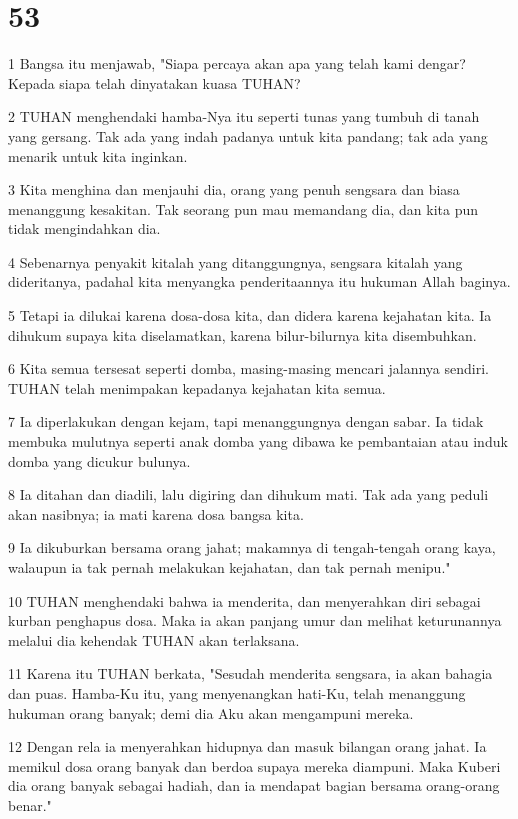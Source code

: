 \chapter{53}

\par 1 Bangsa itu menjawab, "Siapa percaya akan apa yang telah kami dengar? Kepada siapa telah dinyatakan kuasa TUHAN?
\par 2 TUHAN menghendaki hamba-Nya itu seperti tunas yang tumbuh di tanah yang gersang. Tak ada yang indah padanya untuk kita pandang; tak ada yang menarik untuk kita inginkan.
\par 3 Kita menghina dan menjauhi dia, orang yang penuh sengsara dan biasa menanggung kesakitan. Tak seorang pun mau memandang dia, dan kita pun tidak mengindahkan dia.
\par 4 Sebenarnya penyakit kitalah yang ditanggungnya, sengsara kitalah yang dideritanya, padahal kita menyangka penderitaannya itu hukuman Allah baginya.
\par 5 Tetapi ia dilukai karena dosa-dosa kita, dan didera karena kejahatan kita. Ia dihukum supaya kita diselamatkan, karena bilur-bilurnya kita disembuhkan.
\par 6 Kita semua tersesat seperti domba, masing-masing mencari jalannya sendiri. TUHAN telah menimpakan kepadanya kejahatan kita semua.
\par 7 Ia diperlakukan dengan kejam, tapi menanggungnya dengan sabar. Ia tidak membuka mulutnya seperti anak domba yang dibawa ke pembantaian atau induk domba yang dicukur bulunya.
\par 8 Ia ditahan dan diadili, lalu digiring dan dihukum mati. Tak ada yang peduli akan nasibnya; ia mati karena dosa bangsa kita.
\par 9 Ia dikuburkan bersama orang jahat; makamnya di tengah-tengah orang kaya, walaupun ia tak pernah melakukan kejahatan, dan tak pernah menipu."
\par 10 TUHAN menghendaki bahwa ia menderita, dan menyerahkan diri sebagai kurban penghapus dosa. Maka ia akan panjang umur dan melihat keturunannya melalui dia kehendak TUHAN akan terlaksana.
\par 11 Karena itu TUHAN berkata, "Sesudah menderita sengsara, ia akan bahagia dan puas. Hamba-Ku itu, yang menyenangkan hati-Ku, telah menanggung hukuman orang banyak; demi dia Aku akan mengampuni mereka.
\par 12 Dengan rela ia menyerahkan hidupnya dan masuk bilangan orang jahat. Ia memikul dosa orang banyak dan berdoa supaya mereka diampuni. Maka Kuberi dia orang banyak sebagai hadiah, dan ia mendapat bagian bersama orang-orang benar."

